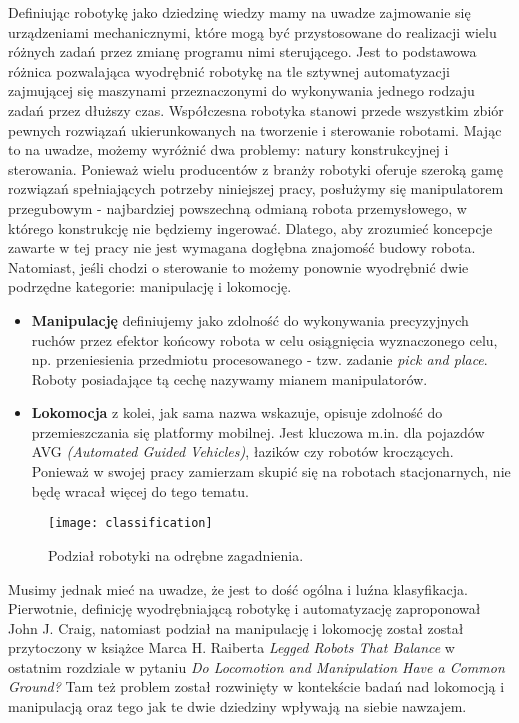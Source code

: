 \documentclass{article}
\begin{document}
Definiując robotykę jako dziedzinę wiedzy mamy na uwadze zajmowanie się urządzeniami mechanicznymi, które mogą być przystosowane do realizacji wielu różnych zadań przez zmianę programu nimi sterującego. Jest to podstawowa różnica pozwalająca wyodrębnić robotykę na tle sztywnej automatyzacji zajmującej się maszynami przeznaczonymi do wykonywania jednego rodzaju zadań przez dłuższy czas. Współczesna robotyka stanowi przede wszystkim zbiór pewnych rozwiązań ukierunkowanych na tworzenie i sterowanie robotami. Mając to na uwadze, możemy wyróżnić dwa problemy: natury konstrukcyjnej i sterowania. Ponieważ wielu producentów z branży robotyki oferuje szeroką gamę rozwiązań spełniających potrzeby niniejszej pracy, posłużymy się manipulatorem przegubowym - najbardziej powszechną odmianą robota przemysłowego, w którego konstrukcję nie będziemy ingerować. Dlatego, aby zrozumieć koncepcje zawarte w tej pracy nie jest wymagana dogłębna znajomość budowy robota. Natomiast, jeśli chodzi o sterowanie to możemy ponownie wyodrębnić dwie podrzędne kategorie: manipulację i lokomocję. 

\begin{itemize}
\item \textbf{Manipulację} definiujemy jako zdolność do wykonywania precyzyjnych ruchów przez efektor końcowy robota w celu osiągnięcia wyznaczonego celu, np. przeniesienia przedmiotu procesowanego - tzw. zadanie \emph{pick and place}. Roboty posiadające tą cechę nazywamy mianem manipulatorów.

\item \textbf{Lokomocja} z kolei, jak sama nazwa wskazuje, opisuje zdolność do przemieszczania się platformy mobilnej. Jest kluczowa m.in. dla pojazdów AVG \emph{(Automated Guided Vehicles)}, łazików czy robotów kroczących. Ponieważ w swojej pracy zamierzam skupić się na robotach stacjonarnych, nie będę wracał więcej do tego tematu.
\end{itemize}

\begin{figure}[h]
\centering
\texttt{[image: classification]}
\caption{Podział robotyki na odrębne zagadnienia.}
\end{figure}

Musimy jednak mieć na uwadze, że jest to dość ogólna i luźna klasyfikacja. Pierwotnie, definicję wyodrębniającą robotykę i automatyzację zaproponował John J. Craig, natomiast podział na manipulację i lokomocję został został przytoczony w książce Marca H. Raiberta \emph{Legged Robots That Balance} w ostatnim rozdziale w pytaniu \emph{Do Locomotion and Manipulation Have a Common Ground?} Tam też problem został rozwinięty w kontekście badań nad lokomocją i manipulacją oraz tego jak te dwie dziedziny wpływają na siebie nawzajem.
\end{document}
